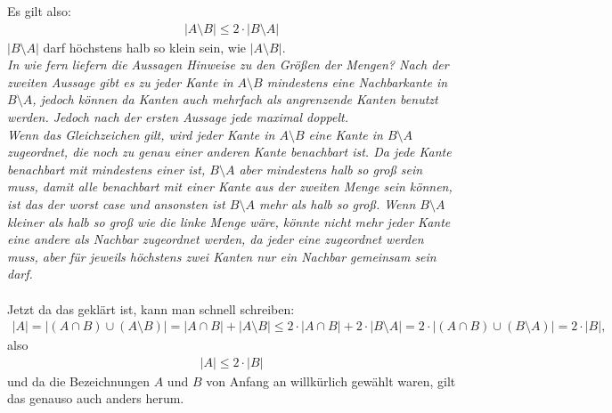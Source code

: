 \documentclass[paper=a4,10pt]{scrartcl}
\begin{document}
\begin{itemize}
Es gilt also: 
\begin{align}
|A\setminus B| \le 2 \cdot |B\setminus A|
\end{align}
$|B \setminus A|$ darf höchstens halb so klein sein, wie $|A \setminus B|$.\\
\textit{In wie fern liefern die Aussagen Hinweise zu den Größen der Mengen? Nach der zweiten Aussage gibt es zu jeder Kante in $A \setminus B$ mindestens eine Nachbarkante in $B\setminus A$, jedoch können da Kanten auch mehrfach als angrenzende Kanten benutzt werden. Jedoch nach der ersten Aussage jede maximal doppelt.\\
Wenn das Gleichzeichen gilt, wird jeder Kante in $A\setminus B$ eine Kante in $B\setminus A$ zugeordnet, die noch zu genau einer anderen Kante benachbart ist. Da jede Kante benachbart mit mindestens einer ist, $B \setminus A$ aber mindestens halb so groß sein muss, damit alle benachbart mit einer Kante aus der zweiten Menge sein können, ist das der worst case und ansonsten ist $B \setminus A$ mehr als halb so groß. Wenn $B\setminus A$ kleiner als halb so groß wie die linke Menge wäre, könnte nicht mehr jeder Kante eine andere als Nachbar zugeordnet werden, da jeder eine zugeordnet werden muss, aber für jeweils höchstens zwei Kanten nur ein Nachbar gemeinsam sein darf.}\\\\
Jetzt da das geklärt ist, kann man schnell schreiben:
\begin{align*}
|A| = |(A \cap B) \cup (A\setminus B)| = |A \cap B| + |A\setminus B| \le 2\cdot |A \cap B| + 2 \cdot |B\setminus A| = 2 \cdot |(A \cap B) \cup (B \setminus A)| = 2\cdot |B|,
\end{align*}
also
\begin{align}
|A| \le 2 \cdot |B|
\end{align}
und da die Bezeichnungen $A$ und $B$ von Anfang an willkürlich gewählt waren, gilt das genauso auch anders herum.





\end{itemize}
\end{document}
